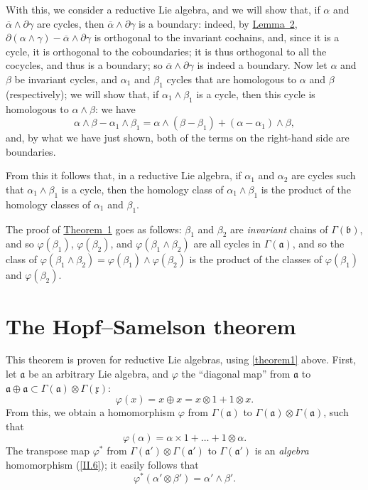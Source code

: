 \documentclass{article}
\newcommand{\fk}{\mathfrak}
\newcommand{\oldpage}[1]{\marginpar{\footnotesize$\Big\vert$ \textit{p.~#1}}}
\begin{document}
With this, we consider a reductive Lie algebra, and we will show that, if $\alpha$ and
\oldpage{50}
$\overline{\alpha}\wedge\partial\gamma$ are cycles, then $\overline{\alpha}\wedge\partial\gamma$ is a boundary:
indeed, by \hyperref[lemma2]{Lemma~2}, 
$\partial(\alpha\wedge\gamma)-\overline{\alpha}\wedge\partial\gamma$ is orthogonal to the invariant cochains, and, since it is a cycle, it is orthogonal to the coboundaries;
it is thus orthogonal to all the cocycles, and thus is a boundary;
so $\overline{\alpha}\wedge\partial\gamma$ is indeed a boundary.
Now let $\alpha$ and $\beta$ be invariant cycles, and $\alpha_1$ and $\beta_1$ cycles that are homologous to $\alpha$ and $\beta$ (respectively);
we will show that, if $\alpha_1\wedge\beta_1$ is a cycle, then this cycle is homologous to $\alpha\wedge\beta$:
we have
\[
  \alpha\wedge\beta - \alpha_1\wedge\beta_1
  = \alpha\wedge(\beta-\beta_1) + (\alpha-\alpha_1)\wedge\beta,
\]
and, by what we have just shown, both of the terms on the right-hand side are boundaries.

From this it follows that, in a reductive Lie algebra, if $\alpha_1$ and $\alpha_2$ are cycles such that $\alpha_1\wedge\beta_1$ is a cycle, then the homology class of $\alpha_1\wedge\beta_1$ is the product of the homology classes of $\alpha_1$ and $\beta_1$.

The proof of \hyperref[theorem1]{Theorem~1} goes as follows:
$\beta_1$ and $\beta_2$ are \emph{invariant} chains of $\Gamma(\fk{b})$, and so $\varphi(\beta_1)$, $\varphi(\beta_2)$, and $\varphi(\beta_1\wedge\beta_2)$ are all cycles in $\Gamma(\fk{a})$, and so the class of $\varphi(\beta_1\wedge\beta_2)=\varphi(\beta_1)\wedge\varphi(\beta_2)$ is the product of the classes of $\varphi(\beta_1)$ and $\varphi(\beta_2)$.


\section{The Hopf--Samelson theorem}
\label{II.7}

This theorem is proven for reductive Lie algebras, using \cref{theorem1} above.
First, let $\fk{a}$ be an arbitrary Lie algebra, and $\varphi$ the ``diagonal map'' from $\fk{a}$ to $\fk{a}\oplus\fk{a}\subset\Gamma(\fk{a})\otimes\Gamma(\fk{x})$:
\[
  \varphi(x) = x\oplus x = x\otimes1 + 1\otimes x.
\]
From this, we obtain a homomorphism $\varphi$ from $\Gamma(\fk{a})$ to $\Gamma(\fk{a})\otimes\Gamma(\fk{a})$, such that
\[
  \varphi(\alpha) = \alpha\times1 + \ldots + 1\otimes\alpha.
\]
The transpose map $\varphi^*$ from $\Gamma(\fk{a}')\otimes\Gamma(\fk{a}')$ to $\Gamma(\fk{a}')$ is an \emph{algebra} homomorphism (\cref{II.6});
it easily follows that
\[
  \varphi^*(\alpha'\otimes\beta') = \alpha'\wedge\beta'.
\]
\end{document}
